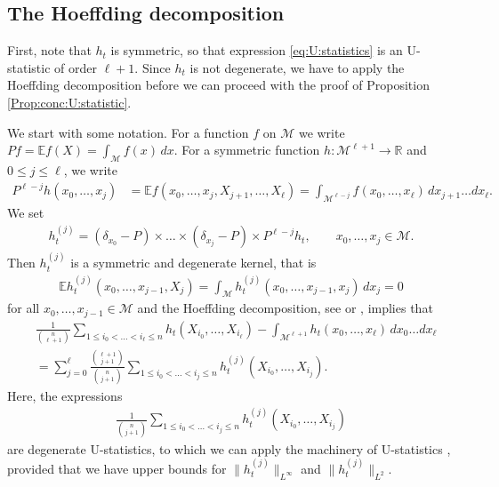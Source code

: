 \documentclass[10pt]{article}
\theoremstyle{plain}
\theoremstyle{definition}
\theoremstyle{remark}
\begin{document}
\subsection{The Hoeffding decomposition}

First, note that $h_t$ is symmetric, so that expression \eqref{eq:U:statistics} is an U-statistic of order $\ell+1$. Since $h_t$ is not degenerate, we have to apply the Hoeffding decomposition before we can proceed with the proof of Proposition \ref{Prop:conc:U:statistic}. 

We start with some notation. For a function $f$ on $\mathcal{M}$ we write $Pf=\mathbb{E}f(X)=\int_\mathcal{M}f(x)\,dx$. For a symmetric function $h:\mathcal{M}^{\ell+1}\rightarrow \mathbb{R}$ and $0\leq j\leq \ell$, we write 
\begin{align*}
    P^{\ell-j}h(x_0,\dots,x_j)&=\mathbb{E}f(x_0,\dots,x_j,X_{j+1},\dots,X_\ell)=\int_{\mathcal{M}^{\ell-j}}f(x_0,\dots,x_\ell)\,dx_{j+1}\dots dx_\ell.
\end{align*}
We set
\begin{align*}
    h_t^{(j)}=(\delta_{x_0}-P)\times \dots\times (\delta_{x_j}-P) \times P^{\ell-j} h_t,\qquad x_0,\dots,x_j\in\mathcal{M}.
\end{align*}
Then $h_t^{(j)}$ is a symmetric and degenerate kernel, that is
\begin{align*}
    \mathbb{E} h_t^{(j)}(x_0,\dots,x_{j-1},X_j)=\int_\mathcal{M}h_t^{(j)}(x_0,\dots,x_{j-1},x_j)\,dx_j=0
\end{align*}
for all $x_0,\dots,x_{j-1}\in\mathcal{M}$ and the Hoeffding decomposition, see \cite[Section 3.5]{PG99} or \cite{Lee90}, implies that 
\begin{align}\label{eq:Hoeffding:decomposition}
    &\frac{1}{\binom{n}{\ell+1}}\sum_{1\leq i_0<\dots<i_\ell\leq n}h_t(X_{i_0},\dots,X_{i_\ell})-\int_{\mathcal{M}^{\ell+1}}h_t(x_0,\dots,x_\ell)\,dx_{0}\dots dx_\ell\\
    &=\sum_{j=0}^\ell \frac{\binom{\ell+1}{j+1}}{\binom{n}{j+1}}\sum_{1\leq i_0<\dots<i_j\leq n}h_t^{(j)}(X_{i_0},\dots,X_{i_j}). \nonumber
\end{align}
Here, the expressions 
\begin{align}
    \frac{1}{\binom{n}{j+1}}\sum_{1\leq i_0<\dots<i_j\leq n}h_t^{(j)}(X_{i_0},\dots,X_{i_j})
\end{align}
are degenerate U-statistics, to which we can apply the machinery of U-statistics \cite{PG99,Mins24}, provided that we have upper bounds for $\|h_t^{(j)}\|_{L^\infty}$ and $\|h_t^{(j)}\|_{L^2}$.
\end{document}

